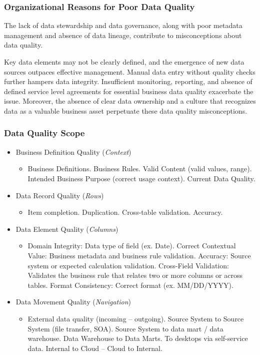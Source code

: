 \subsubsection{Organizational Reasons for Poor Data Quality}
The lack of data stewardship and data governance, along with poor metadata management and absence of data lineage, contribute to misconceptions about data quality. 

Key data elements may not be clearly defined, and the emergence of new data sources outpaces effective management. Manual data entry without quality checks further hampers data integrity. Insufficient monitoring, reporting, and absence of defined service level agreements for essential business data quality exacerbate the issue. Moreover, the absence of clear data ownership and a culture that recognizes data as a valuable business asset perpetuate these data quality misconceptions.

\subsubsection{Data Quality Scope}
\begin{itemize}
    \item Business Definition Quality (\textit{Context})
    \begin{itemize}
        \item Business Definitions. Business Rules. Valid Content (valid values, range). Intended Business Purpose (correct usage context). Current Data Quality.
    \end{itemize}
    \item Data Record Quality (\textit{Rows})
    \begin{itemize}
        \item Item completion. Duplication. Cross-table validation. Accuracy.
    \end{itemize}
        \item Data Element Quality (\textit{Columns})
    \begin{itemize}
        \item Domain Integrity: Data type of field (ex. Date). Correct Contextual Value: Business metadata and business rule validation. Accuracy: Source system or expected calculation validation. Cross-Field Validation: Validates the business rule that relates two or more
        columns or across tables. Format Consistency: Correct format (ex. MM/DD/YYYY).
    \end{itemize}
    \item Data Movement Quality (\textit{Navigation})
    \begin{itemize}
        \item External data quality (incoming – outgoing). Source System to Source System (file transfer, SOA). Source System to data mart / data warehouse. Data Warehouse to Data Marts. To desktops via self-service data. Internal to Cloud – Cloud to Internal. 
    \end{itemize}
\end{itemize}

